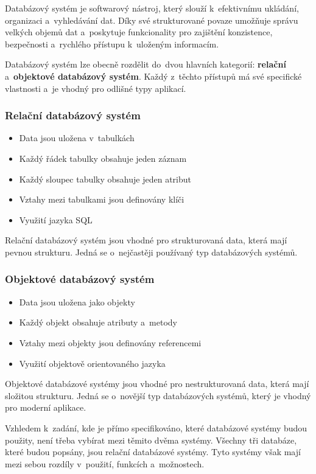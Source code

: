 Databázový systém je softwarový nástroj, který slouží k~efektivnímu ukládání, organizaci a~vyhledávání dat. 
Díky své strukturované povaze umožňuje správu velkých objemů dat a~poskytuje funkcionality pro 
zajištění konzistence, bezpečnosti a~rychlého přístupu k~uloženým informacím.

Databázový systém lze obecně rozdělit do~dvou hlavních kategorií: \textbf{relační} a~\textbf{objektové databázový systém}. 
Každý z~těchto přístupů má své specifické vlastnosti a~je vhodný pro odlišné typy aplikací.

\subsubsection*{Relační databázový systém}
\begin{itemize}[itemsep=-1pt]
    \item Data jsou uložena v~tabulkách
    \item Každý řádek tabulky obsahuje jeden záznam
    \item Každý sloupec tabulky obsahuje jeden atribut
    \item Vztahy mezi tabulkami jsou definovány klíči
    \item Využití jazyka SQL
\end{itemize}
Relační databázový systém jsou vhodné pro strukturovaná data, která mají pevnou strukturu.
Jedná se o~nejčastěji používaný typ databázových systémů.

\subsubsection*{Objektové databázový systém}
\begin{itemize}[itemsep=-1pt]
    \item Data jsou uložena jako objekty
    \item Každý objekt obsahuje atributy a~metody
    \item Vztahy mezi objekty jsou definovány referencemi
    \item Využití objektově orientovaného jazyka
\end{itemize}
Objektové databázové systémy jsou vhodné pro nestrukturovaná data, která mají složitou strukturu.
Jedná se o~novější typ databázových systémů, který je vhodný pro moderní aplikace.

Vzhledem k~zadání, kde je přímo specifikováno, které databázové systémy budou použity,
není třeba vybírat mezi těmito dvěma systémy. Všechny tři databáze, které budou popsány,
jsou relační databázové systémy. Tyto systémy však mají mezi sebou rozdíly v~použití, funkcích a~možnostech.

